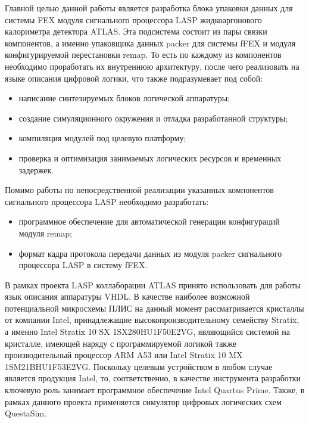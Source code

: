 Главной целью данной работы является разработка блока упаковки данных для системы FEX модуля сигнального процессора LASP жидкоаргонового калориметра детектора ATLAS. Эта подсистема состоит из пары связки компонентов, а именно упаковщика данных packer для системы fFEX и  модуля конфигурируемой перестановки remap. То есть по каждому из компонентов необходимо проработать их внутреннюю архитектуру, после чего реализовать на языке описания цифровой логики, что также подразумевает под собой:\par
\begin{itemize}
    \item написание синтезируемых блоков логической аппаратуры;
    \item создание симуляционного окружения и отладка разработанной структуры;
    \item компиляция модулей под целевую платформу;
    \item проверка и оптимизация занимаемых логических ресурсов и временных задержек.
\end{itemize}\par
Помимо работы по непосредственной реализации указанных компонентов сигнального процессора LASP необходимо разработать:\par
\begin{itemize}
    \item программное обеспечение для автоматической генерации конфигураций модуля remap;
    \item формат кадра протокола передачи данных из модуля packer сигнального процессора LASP в систему fFEX.
\end{itemize}\par
В рамках проекта LASP коллаборации ATLAS принято использовать для работы язык описания аппаратуры VHDL. В качестве наиболее возможной потенциальной микросхемы ПЛИС на данный момент рассматривается кристаллы от компании Intel, принадлежащие высокопроизводительному семейству Stratix, а именно Intel Stratix 10 SX 1SX280HU1F50E2VG, являющийся системой на кристалле, имеющей наряду с программируемой логикой также производительный процессор ARM A53 или Intel Stratix 10 MX 1SM21BHU1F53E2VG. Поскольку целевым устройством в любом случае является продукция Intel, то, соответственно, в качестве инструмента разработки ключевую роль занимает программное обеспечение Intel Quartus Prime. Также, в рамках данного проекта применяется симулятор цифровых логических схем QuestaSim.\par

